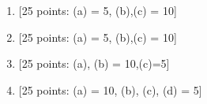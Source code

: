\documentclass[11pt]{article}
\begin{document}
\newpage
\setcounter{page}{1}
\begin{enumerate}

\item {[25 points: (a) = 5, (b),(c) = 10]}
\vspace*{.5em}

\newpage


\newpage
\item {[25 points: (a) = 5, (b),(c) = 10]}
\vspace*{.5em}


\newpage
\item {[25 points: (a), (b) = 10,(c)=5]}
\vspace*{.5em}


\newpage
\item {[25 points: (a) = 10, (b), (c), (d) = 5]}
\vspace*{.5em}

\newpage



%

%
%

%
%


%

\end{enumerate}
\end{document}

